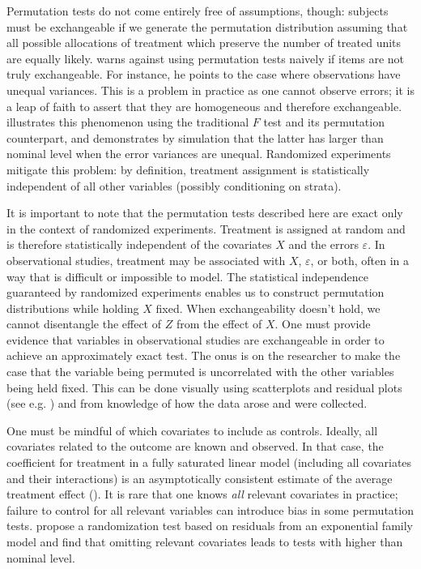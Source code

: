 \documentclass[12pt]{article}
\begin{document}
Permutation tests do not come entirely free of assumptions, though: 
subjects must be exchangeable if we generate the permutation distribution assuming that all possible allocations of treatment which preserve the number of treated units are equally likely.
\cite{romano_behavior_1990} warns against using permutation tests naively if items are not truly exchangeable. 
For instance, he points to the case where observations have unequal variances.  
This is a problem in practice as one cannot observe errors; it is a leap of faith to assert that they are homogeneous and therefore exchangeable.
\cite{boik_fisherpitman_1987} illustrates this phenomenon using the traditional $F$ test and its permutation counterpart, 
and demonstrates by simulation that the latter has larger than nominal level when the error variances are unequal.
Randomized experiments mitigate this problem: by definition, treatment assignment is statistically independent of all other variables (possibly conditioning on strata).

It is important to note that the permutation tests described here are exact only in the context of randomized experiments.
Treatment is assigned at random and is therefore statistically independent of the covariates $X$ and the errors $\varepsilon$.
In observational studies, treatment may be associated with $X$, $\varepsilon$, or both, often in a way that is difficult or impossible to model.
The statistical independence guaranteed by randomized experiments enables us to construct permutation distributions while holding $X$ fixed.
When exchangeability doesn't hold, we cannot disentangle the effect of $Z$ from the effect of $X$.
One must provide evidence that variables in observational studies are exchangeable in order to achieve an approximately exact test.
The onus is on the researcher to make the case that the variable being permuted is uncorrelated with the other variables being held fixed.
This can be done visually using scatterplots and residual plots (see e.g. \cite{freedman_nonstochastic_1983}) and from knowledge of how the data arose and were collected.

One must be mindful of which covariates to include as controls.
Ideally, all covariates related to the outcome are known and observed.
In that case, the coefficient for treatment in a fully saturated linear model (including all covariates and their interactions) is an asymptotically consistent estimate of the average treatment effect (\cite{lin_agnostic_2013}).
It is rare that one knows \textit{all} relevant covariates in practice; failure to control for all relevant variables can introduce bias in some permutation tests.
 \cite{gail_tests_1988} propose a randomization test based on residuals from an exponential family model and find that omitting relevant covariates leads to tests with higher than nominal level.
 
\end{document}
